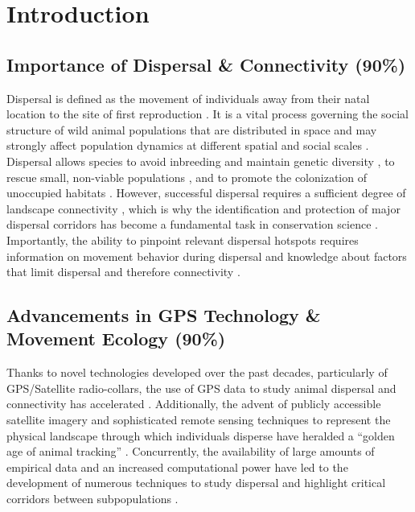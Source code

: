 \documentclass[abstract=on,10pt,a4paper,bibliography=totocnumbered]{article}
\begin{document}
\newpage

\onehalfspacing
\tableofcontents
\doublespacing

\newpage
{}

\linenumbers

\section{Introduction}

\subsection{Importance of Dispersal \& Connectivity (90\%)}
Dispersal is defined as the movement of individuals away from their natal
location to the site of first reproduction \cite{Howard.1960}. It is a vital
process governing the social structure of wild animal populations that are
distributed in space \citep{Hanski.1998, Clobert.2012} and may strongly affect
population dynamics at different spatial and social scales \citep{Hanski.1999a,
Clobert.2012}. Dispersal allows species to avoid inbreeding and maintain genetic
diversity \citep{Perrin.1999, Perrin.2000, Frankham.2002, Leigh.2012,
Baguette.2013}, to rescue small, non-viable populations \citep{Brown.1977}, and
to promote the colonization of unoccupied habitats \citep{Hanski.1999b,
MacArthur.2001}. However, successful dispersal requires a sufficient degree of
landscape connectivity \citep{Fahrig.2003, Clobert.2012}, which is why the
identification and protection of major dispersal corridors has become a
fundamental task in conservation science \citep{Nathan.2008, Doerr.2011,
Rudnick.2012}. Importantly, the ability to pinpoint relevant dispersal hotspots
requires information on movement behavior during dispersal and knowledge about
factors that limit dispersal and therefore connectivity \citep{Baguette.2013,
Vasudev.2015}.

\subsection{Advancements in GPS Technology \& Movement Ecology (90\%)}
Thanks to novel technologies developed over the past decades, particularly of
GPS/Satellite radio-collars, the use of GPS data to study animal dispersal and
connectivity has accelerated \citep{Elliot.2014, Jonsson.2016, Williams.2019}.
Additionally, the advent of publicly accessible satellite imagery and
sophisticated remote sensing techniques to represent the physical landscape
through which individuals disperse have heralded a ``golden age of animal
tracking'' \citep{Kays.2015}. Concurrently, the availability of large amounts of
empirical data and an increased computational power have led to the development
of numerous techniques to study dispersal and highlight critical corridors
between subpopulations \citep{Boyce.2002, Fortin.2005, Cushman.2010,
Zeller.2012, Diniz.2020}.
\end{document}
